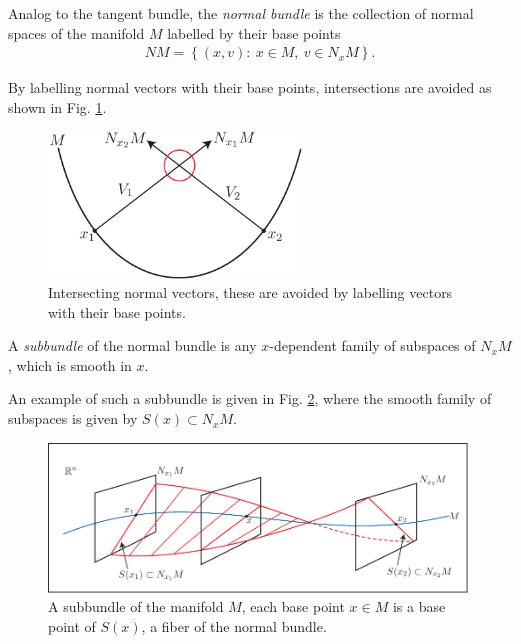 \begin{definition}
	Analog to the tangent bundle, the \emph{normal bundle} is the collection of normal spaces of the manifold $M$ labelled by their base points
	\begin{align}
	\boxed{
		NM = \left\{ (x,v):\ x\in M,\ v\in N_{x}M \right\}.
	}
	\end{align}
\end{definition}
By labelling normal vectors with their base points, intersections are avoided as shown in Fig. \ref{fig:normal_vector_intersection}.
\begin{figure}[h!]
	\centering
	\includegraphics[width=0.6\textwidth]{figures/ch9/9normal_vector_intersection.pdf}
	\caption{Intersecting normal vectors, these are avoided by labelling vectors with their base points.}
	\label{fig:normal_vector_intersection}
\end{figure}

\begin{definition}
	A \emph{subbundle} of the normal bundle is any $x$-dependent family of subspaces of $N_{x}M$, which is smooth in $x$.
\end{definition}
An example of such a subbundle is given in Fig. \ref{fig:subbundle_ex}, where the smooth family of subspaces is given by $S(x)\subset N_{x}M$.
\begin{figure}[h!]
	\centering
	\includegraphics[width=0.99\textwidth]{figures/ch9/10subbundle_ex.pdf}
	\caption{A subbundle of the manifold $M$, each base point $x\in M$ is a base point of $S(x)$, a fiber of the normal bundle.}
	\label{fig:subbundle_ex}
\end{figure}


